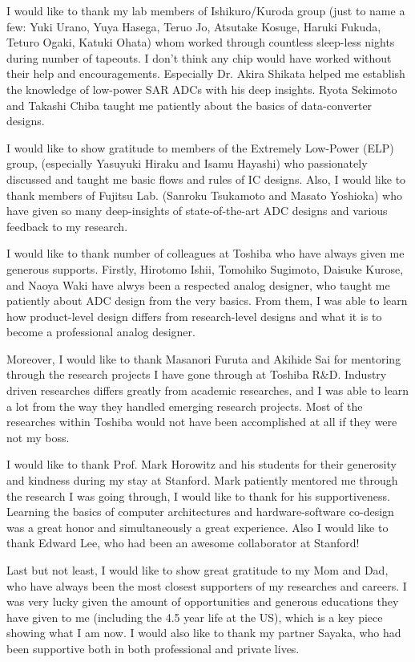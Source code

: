 I would like to thank my lab members of Ishikuro/Kuroda group (just to name a few: Yuki Urano, Yuya Hasega, Teruo Jo, Atsutake Kosuge, Haruki Fukuda, Teturo Ogaki, Katuki Ohata) whom worked through countless sleep-less nights during number of tapeouts. I don't think any chip would have worked without their help and encouragements. Especially Dr. Akira Shikata helped me establish the knowledge of low-power SAR ADCs with his deep insights. Ryota Sekimoto and Takashi Chiba taught me patiently about the basics of data-converter designs. 

I would like to show gratitude to members of the Extremely Low-Power (ELP) group, (especially Yasuyuki Hiraku and Isamu Hayashi) who passionately discussed  and taught me basic flows and rules of IC designs. Also, I would like to thank members of Fujitsu Lab. (Sanroku Tsukamoto and Masato Yoshioka) who have given so many deep-insights of state-of-the-art ADC designs and various feedback to my research. 

I would like to thank number of colleagues at Toshiba who have always given me generous supports. 
Firstly, Hirotomo Ishii, Tomohiko Sugimoto, Daisuke Kurose, and Naoya Waki have alwys been a respected analog designer, who taught me patiently about ADC design from the very basics. From them, I was able to learn how product-level design differs from research-level designs and what it is to become a professional analog designer.

Moreover, I would like to thank Masanori Furuta and Akihide Sai for mentoring through the research projects I have gone through at Toshiba R&D. Industry driven researches differs greatly from academic researches, and I was able to learn a lot from the way they handled emerging research projects. Most of the researches within Toshiba would not have been accomplished at all if they were not my boss.

I would like to thank Prof. Mark Horowitz and his students for their generosity and kindness during my stay at Stanford. Mark patiently mentored me through the research I was going through, I would like to thank for his supportiveness. Learning the basics of computer architectures and hardware-software co-design was a great honor and simultaneously a great experience. Also I would like to thank Edward Lee, who had been an awesome collaborator at Stanford! 

Last but not least, I would like to show great gratitude to my Mom and Dad, who have always been the most closest  supporters of my researches and careers. I was very lucky given the amount of opportunities and generous educations they have given to me (including the 4.5 year life at the US), which is a key piece showing what I am now. I would also like to thank my partner Sayaka, who had been supportive both in both professional and private lives.
